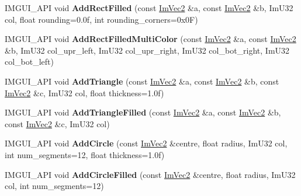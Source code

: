 \begin{DoxyCompactItemize}
\item 
\mbox{\label{struct_im_draw_list_ab611dd9a03b878f3cc7db25c403b5766}} 
I\+M\+G\+U\+I\+\_\+\+A\+PI void {\bfseries Add\+Rect\+Filled} (const \mbox{\hyperlink{struct_im_vec2}{Im\+Vec2}} \&a, const \mbox{\hyperlink{struct_im_vec2}{Im\+Vec2}} \&b, Im\+U32 col, float rounding=0.\+0f, int rounding\+\_\+corners=0x0\+F)
\item 
\mbox{\label{struct_im_draw_list_af8e1758e416bacfdbac38043a85c364b}} 
I\+M\+G\+U\+I\+\_\+\+A\+PI void {\bfseries Add\+Rect\+Filled\+Multi\+Color} (const \mbox{\hyperlink{struct_im_vec2}{Im\+Vec2}} \&a, const \mbox{\hyperlink{struct_im_vec2}{Im\+Vec2}} \&b, Im\+U32 col\+\_\+upr\+\_\+left, Im\+U32 col\+\_\+upr\+\_\+right, Im\+U32 col\+\_\+bot\+\_\+right, Im\+U32 col\+\_\+bot\+\_\+left)
\item 
\mbox{\label{struct_im_draw_list_a4954e6ea71858501270a80daaf087a9a}} 
I\+M\+G\+U\+I\+\_\+\+A\+PI void {\bfseries Add\+Triangle} (const \mbox{\hyperlink{struct_im_vec2}{Im\+Vec2}} \&a, const \mbox{\hyperlink{struct_im_vec2}{Im\+Vec2}} \&b, const \mbox{\hyperlink{struct_im_vec2}{Im\+Vec2}} \&c, Im\+U32 col, float thickness=1.\+0f)
\item 
\mbox{\label{struct_im_draw_list_ad046c71c7d5e4dbe5506c0a1f794fc2e}} 
I\+M\+G\+U\+I\+\_\+\+A\+PI void {\bfseries Add\+Triangle\+Filled} (const \mbox{\hyperlink{struct_im_vec2}{Im\+Vec2}} \&a, const \mbox{\hyperlink{struct_im_vec2}{Im\+Vec2}} \&b, const \mbox{\hyperlink{struct_im_vec2}{Im\+Vec2}} \&c, Im\+U32 col)
\item 
\mbox{\label{struct_im_draw_list_adeb4dd03bd2004a94ef13f54d5526b41}} 
I\+M\+G\+U\+I\+\_\+\+A\+PI void {\bfseries Add\+Circle} (const \mbox{\hyperlink{struct_im_vec2}{Im\+Vec2}} \&centre, float radius, Im\+U32 col, int num\+\_\+segments=12, float thickness=1.\+0f)
\item 
\mbox{\label{struct_im_draw_list_a69ace164b2e5d949b09e299606cc77da}} 
I\+M\+G\+U\+I\+\_\+\+A\+PI void {\bfseries Add\+Circle\+Filled} (const \mbox{\hyperlink{struct_im_vec2}{Im\+Vec2}} \&centre, float radius, Im\+U32 col, int num\+\_\+segments=12)
\item 
\mbox{\label{struct_im_draw_list_abd3ce88c86a20632f89d9ac324b02b51}} 

\end{DoxyCompactItemize}
